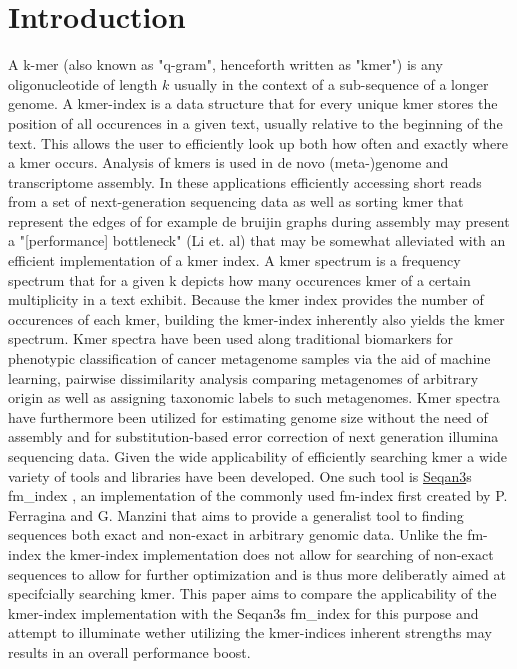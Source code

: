 \chapter{Introduction}
A k-mer (also known as "q-gram", henceforth written as "kmer") is any oligonucleotide of length $k$ usually in the
context of a sub-sequence of a longer genome. A kmer-index is a data structure that for every unique kmer
stores the position of all occurences in a given text, usually relative to the beginning of the text.
This allows the user to efficiently look up both how often and exactly where a kmer occurs.
Analysis of kmers is used in de novo (meta-)genome\cite{megahit} and transcriptome\cite{SOAPdenovo-Trans} assembly.
In these applications efficiently accessing short reads from a set of next-generation sequencing data as well as sorting
kmer that represent the edges of for example de bruijin graphs during assembly may present a
"[performance] bottleneck" (Li et. al) that may be somewhat alleviated with an efficient implementation of a kmer index.
\newline
A kmer spectrum is a frequency spectrum that for a given k depicts how many occurences kmer of a certain multiplicity in a text
exhibit. %
Because the kmer index provides the number of occurences of each kmer, building the kmer-index inherently also yields
the kmer spectrum. Kmer spectra have been used along traditional biomarkers for phenotypic classification of cancer
metagenome samples via the aid of machine learning\cite{phenotype:classification:with:kmer:spectrum}, pairwise dissimilarity
analysis comparing metagenomes of arbitrary origin\cite{kmer:spectrum:dissimilarity} as well as assigning taxonomic labels
to such metagenomes\cite{kraken:metagenome:classification}. Kmer spectra have furthermore been utilized for estimating genome
size without the need of assembly\cite{genome:size:estimation} and for substitution-based error correction
of next generation illumina sequencing data\cite{musket:kmer:spectrum:error:correction}.
\newline
Given the wide applicability of efficiently searching kmer a wide variety of tools and libraries have been developed.
One such tool is \href{https://github.com/seqan/seqan3}{Seqan3}s fm\_index \cite{fm:index:master:thesis}, an implementation
of the commonly used fm-index first created by P. Ferragina and G. Manzini \cite{original:fm} that aims to provide a generalist
tool to finding sequences both exact and non-exact in arbitrary genomic data.
Unlike the fm-index the kmer-index implementation does not allow for searching of non-exact sequences to allow for further
optimization and is thus more deliberatly aimed at specifcially searching kmer. This paper aims to compare the applicability
of the kmer-index implementation with the Seqan3s fm\_index for this purpose and attempt to illuminate wether utilizing
the kmer-indices inherent strengths may results in an overall performance boost.